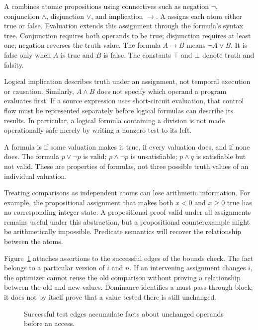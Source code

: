A  combines atomic propositions using connectives such as negation $\neg$, conjunction $\land$, disjunction $\lor$, and implication $\rightarrow$.
A  assigns each atom either true or false.
Evaluation extends this assignment through the formula's syntax tree.
Conjunction requires both operands to be true; disjunction requires at least one; negation reverses the truth value.
The formula $A\rightarrow B$ means $\neg A\lor B$.
It is false only when $A$ is true and $B$ is false.
The constants $\top$ and $\bot$ denote truth and falsity.

Logical implication describes truth under an assignment, not temporal execution or causation.
Similarly, $A\land B$ does not specify which operand a program evaluates first.
If a source expression uses short-circuit evaluation, that control flow must be represented separately before logical formulas can describe its results.
In particular, a logical formula containing a division is not made operationally safe merely by writing a nonzero test to its left.

A formula is  if some valuation makes it true,  if every valuation does, and  if none does.
The formula $p\lor\neg p$ is valid; $p\land\neg p$ is unsatisfiable; $p\land q$ is satisfiable but not valid.
These are properties of formulas, not three possible truth values of an individual valuation.

Treating comparisons as independent atoms can lose arithmetic information.
For example, the propositional assignment that makes both $x<0$ and $x\geq0$ true has no corresponding integer state.
A propositional proof valid under all assignments remains useful under this abstraction, but a propositional counterexample might be arithmetically impossible.
Predicate semantics will recover the relationship between the atoms.

Figure~\ref{fig:ch40-guard-facts} attaches assertions to the successful edges of the bounds check.
The fact belongs to a particular version of $i$ and $n$.
If an intervening assignment changes $i$, the optimizer cannot reuse the old comparison without proving a relationship between the old and new values.
Dominance identifies a must-pass-through block; it does not by itself prove that a value tested there is still unchanged.

\begin{figure}
\centering

\caption{Successful test edges accumulate facts about unchanged operands before an access.}
\label{fig:ch40-guard-facts}
\end{figure}

